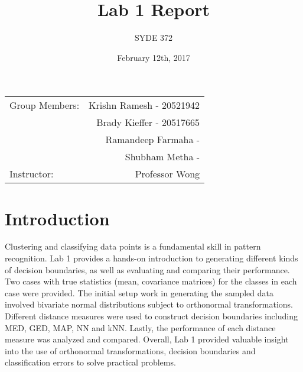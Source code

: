 \documentclass{article}
\title{Lab 1 Report} %
\author{SYDE 372} %
\date{February 12th, 2017} %
\begin{document}
\maketitle

\begin{center}
\begin{tabular}{l r}
Group Members: & Krishn Ramesh - 20521942 \\ %
& Brady Kieffer - 20517665 \\
& Ramandeep Farmaha - \\
& Shubham Metha - \\
Instructor: & Professor Wong %
\end{tabular}
\end{center}



\section{Introduction}

Clustering and classifying data points is a fundamental skill in pattern recognition. Lab 1 provides a hands-on introduction to generating different kinds of decision boundaries, as well as evaluating and comparing their performance. Two cases with true statistics (mean, covariance matrices) for the classes in each case were provided. The initial setup work in generating the sampled data involved bivariate normal distributions subject to orthonormal transformations. Different distance measures were used to construct decision boundaries including MED, GED, MAP, NN and kNN. Lastly, the performance of each distance measure was analyzed and compared. Overall, Lab 1 provided valuable insight into the use of orthonormal transformations, decision boundaries and classification errors to solve practical problems.
\end{document}
